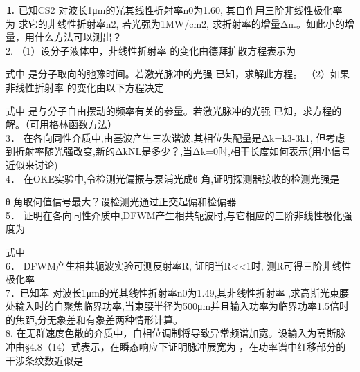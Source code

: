 \begin{exercise}
    ⒈ 已知CS2  对波长1μm的光其线性折射率n0为1.60, 其自作用三阶非线性极化率  为 求它的非线性折射率n2, 若光强为1MW/cm2, 求折射率的增量Δn.。如此小的增量，用什么方法可以测出？\\
    2. （1）设分子液体中，非线性折射率 的变化由德拜扩散方程表示为
   
  式中 是分子取向的弛豫时间。若激光脉冲的光强 已知，求解此方程。
  （2）如果非线性折射率 的变化由以下方程决定
            
  式中 是与分子自由摆动的频率有关的参量。若激光脉冲的光强 已知，求方程的解。（可用格林函数方法）\\
    3． 在各向同性介质中,由基波产生三次谐波,其相位失配量是Δk=k3-3k1, 但考虑到折射率随光强改变,新的ΔkNL是多少？,当Δk=0时,相干长度如何表示(用小信号近似来讨论)\\
    4． 在OKE实验中,令检测光偏振与泵浦光成θ 角,证明探测器接收的检测光强是
             
  θ 角取何值信号最大？设检测光通过正交起偏和检偏器\\
    5． 证明在各向同性介质中,DFWM产生相共轭波时,与它相应的三阶非线性极化强度为
            
  式中  \\
     6． DFWM产生相共轭波实验可测反射率R, 证明当R<<1时, 测R可得三阶非线性极化率     \\
     7．已知苯  对波长1μm的光其线性折射率n0为1.49,其非线性折射率 ,求高斯光束腰处输入时的自聚焦临界功率,当束腰半径为500μm并且输入功率为临界功率1.5倍时的焦距,分无象差和有象差两种情形计算。\\
     8.  在无群速度色散的介质中，自相位调制将导致异常频谱加宽。设输入为高斯脉冲由§4.8（14）式表示，在瞬态响应下证明脉冲展宽为   ，在功率谱中红移部分的干涉条纹数近似是                                   
  
\end{exercise}